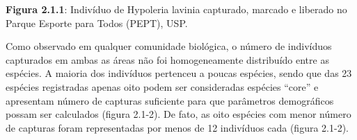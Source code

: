 \textbf{Figura 2.1.1}: Indivíduo de Hypoleria lavinia capturado, marcado e liberado no Parque Esporte para Todos (PEPT), USP.

Como observado em qualquer comunidade biológica, o número de indivíduos capturados em ambas as áreas não foi homogeneamente distribuído entre as espécies. A maioria dos indivíduos pertenceu a poucas espécies, sendo que das 23 espécies registradas apenas oito podem ser consideradas espécies “core” e apresentam número de capturas suficiente para que parâmetros demográficos possam ser calculados (figura 2.1-2). De fato, as oito espécies com menor número de capturas foram representadas por menos de 12 indivíduos cada (figura 2.1-2).
